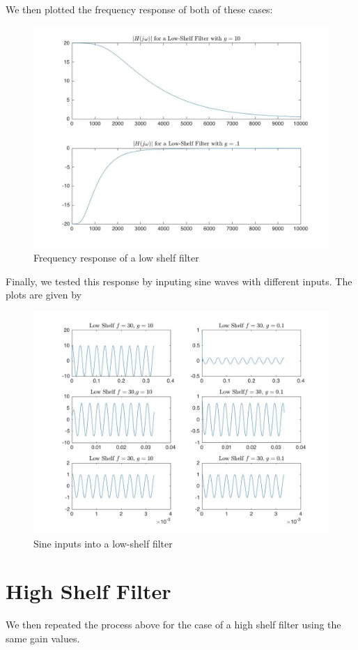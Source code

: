 \documentclass{article}
\begin{document}
    
        \FloatBarrier
 We then plotted the frequency response of both of these cases:
 
 \begin{figure}[!htb]
        \centering
        \includegraphics[width=0.6\linewidth, height=0.3\textheight]{lowshelf.jpg}
        \caption{Frequency response of a low shelf filter}
\end{figure}
\FloatBarrier
Finally, we tested this response by inputing sine waves with different inputs. The plots are given by 

 \begin{figure}[!htb]
        \centering
        \includegraphics[width=0.8\linewidth, height=0.4\textheight]{lowsine.jpg}
        \caption{Sine inputs into a low-shelf filter}
\end{figure}
\FloatBarrier
\clearpage
\section{High Shelf Filter}
We then repeated the process above for the case of a high shelf filter using the same gain values.
\end{document}
